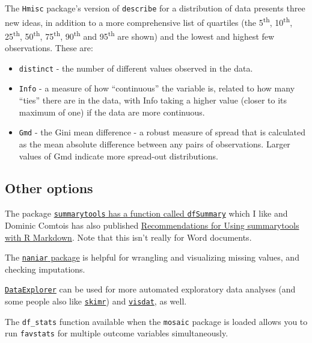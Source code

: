 \documentclass[
]{book}
\providecommand{\tightlist}{%
  \setlength{\itemsep}{0pt}\setlength{\parskip}{0pt}}
\begin{document}
The \texttt{Hmisc} package's version of \texttt{describe} for a distribution of data presents three new ideas, in addition to a more comprehensive list of quartiles (the 5\textsuperscript{th}, 10\textsuperscript{th}, 25\textsuperscript{th}, 50\textsuperscript{th}, 75\textsuperscript{th}, 90\textsuperscript{th} and 95\textsuperscript{th} are shown) and the lowest and highest few observations. These are:

\begin{itemize}
\tightlist
\item
  \texttt{distinct} - the number of different values observed in the data.
\item
  \texttt{Info} - a measure of how ``continuous'' the variable is, related to how many ``ties'' there are in the data, with Info taking a higher value (closer to its maximum of one) if the data are more continuous.
\item
  \texttt{Gmd} - the Gini mean difference - a robust measure of spread that is calculated as the mean absolute difference between any pairs of observations. Larger values of Gmd indicate more spread-out distributions.
\end{itemize}

\hypertarget{other-options}{%
\subsection{Other options}\label{other-options}}

The package \href{https://cran.r-project.org/web/packages/summarytools/vignettes/Introduction.html}{\texttt{summarytools} has a function called \texttt{dfSummary}} which I like and Dominic Comtois has also published \href{https://cran.r-project.org/web/packages/summarytools/vignettes/Recommendations-rmarkdown.html}{Recommendations for Using summarytools with R Markdown}. Note that this isn't really for Word documents.

The \href{http://naniar.njtierney.com/}{\texttt{naniar} package} is helpful for wrangling and visualizing missing values, and checking imputations.

\href{https://boxuancui.github.io/DataExplorer/}{\texttt{DataExplorer}} can be used for more automated exploratory data analyses (and some people also like \href{https://github.com/ropensci/skimr}{\texttt{skimr}}) and \href{http://visdat.njtierney.com/}{\texttt{visdat}}, as well.

The \texttt{df\_stats} function available when the \texttt{mosaic} package is loaded allows you to run \texttt{favstats} for multiple outcome variables simultaneously.
\end{document}
